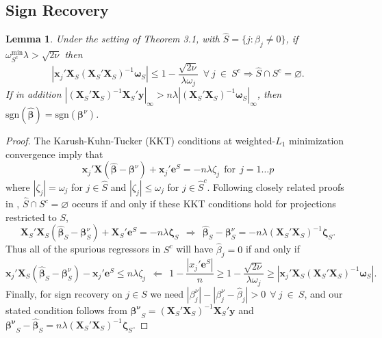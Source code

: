 \documentclass[12pt]{article}
\newtheorem{lemma}{\sc Lemma}[section]
\newcommand{\bs}[1]{\boldsymbol{#1}}
\newcommand{\mr}[1]{\mathrm{#1}}
\newcommand{\bm}[1]{\mathbf{#1}}
\begin{document}
\subsection{Sign Recovery}

\begin{lemma}\label{signrecov}
Under the setting of Theorem 3.1, with $\hat S = \{j:\hat\beta_j \neq 0\}$, if $\omega_{S^c}^{\mr{min}}\lambda > \sqrt{2\nu}$ then
\begin{equation}
|\bs{x}_j'\bm{X}_S(\bm{X}_S'\bm{X}_S)^{-1}\bs{\omega}_S| \leq 1 - \frac{\sqrt{2\nu}}{\lambda\omega_j}~~\forall~j ~\in~S^c \Rightarrow \hat{S} \cap S^c = \varnothing.
\end{equation}
 If in addition
$\left|(\bm{X}_S'\bm{X}_S)^{-1}\bm{X}_S'\bm{y}\right|_\infty > n\lambda\left|(\bm{X}_S'\bm{X}_S)^{-1}\bs{\omega}_S\right|_\infty$, then 
$\mr{sgn}(\bs{\hat\beta}) = \mr{sgn}(\bs{\beta}^\nu)$.
\end{lemma}
\begin{proof} 
The Karush-Kuhn-Tucker (KKT) conditions at weighted-$L_1$ minimization convergence imply that 
\begin{equation}
\bm{x}_j'\bm{X}(\bs{\hat\beta}-\bs{\beta}^\nu) + \bm{x}_j'\bm{e}^S = -n\lambda\zeta_j~~\text{for}~~j=1\dots p
\end{equation} where $|\zeta_j| = \omega_j$ for $j\in\hat S$ and $|\zeta_j| \leq \omega_j$ for $j\in\hat S^c$.  Following  closely related proofs in \cite{wainwright_sharp_2006,wainwright_sharp_2009,zhou_adaptive_2009}, 
$\hat{S} \cap S^c = \varnothing$ occurs if and only if these KKT conditions
hold for projections restricted to $S$,
\begin{equation}
\bm{X}_S'\bm{X}_S(\bs{\hat\beta}_S-\bs{\beta}^\nu_S) + \bm{X}_S'\bm{e}^S =-n\lambda\bs{\zeta}_S ~~\Rightarrow~~ \bs{\hat\beta}_S-\bs{\beta}^\nu_S = -n\lambda(\bm{X}_S'\bm{X}_S)^{-1}\bs{\zeta}_S.
\end{equation}
Thus all of the spurious regressors in $S^c$ will have $\hat \beta_j = 0$
if and only if
\begin{equation}
\bs{x}_j'\bm{X}_S(\bs{\hat\beta}_S-\bs{\beta}^\nu_S) - \bs{x}_j'\bm{e}^S 
\leq n\lambda\zeta_j ~~\Leftarrow~~
1 - \frac{|x_j'\bm{e}^S|}{n} \geq 1 - \frac{\sqrt{2\nu}}{\lambda\omega_j} \geq |\bs{x}_j'\bm{X}_S(\bm{X}_S'\bm{X}_S)^{-1}\bs{\omega}_S|.
\end{equation}
Finally, for sign recovery on $j\in S$ we need 
$
|\beta_j^\nu| - |\beta^\nu_j - \hat\beta_j| > 0 ~~\forall~j~\in~S
$,
and our stated condition follows from  $\bs{\beta^\nu}_S =
(\bm{X}_S'\bm{X}_S)^{-1}\bm{X}_S'\bm{y}$ and $ \bs{\beta^\nu}_S-
\bs{\hat\beta}_S = n\lambda (\bm{X}_S'\bm{X}_S)^{-1}\bs{\zeta}_S$.
\end{proof}
\end{document}
